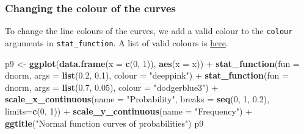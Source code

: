 \documentclass[]{article}
\newenvironment{Shaded}{\begin{snugshade}}{\end{snugshade}}
\newcommand{\KeywordTok}[1]{\textcolor[rgb]{0.13,0.29,0.53}{\textbf{{#1}}}}
\newcommand{\DataTypeTok}[1]{\textcolor[rgb]{0.13,0.29,0.53}{{#1}}}
\newcommand{\DecValTok}[1]{\textcolor[rgb]{0.00,0.00,0.81}{{#1}}}
\newcommand{\FloatTok}[1]{\textcolor[rgb]{0.00,0.00,0.81}{{#1}}}
\newcommand{\StringTok}[1]{\textcolor[rgb]{0.31,0.60,0.02}{{#1}}}
\newcommand{\NormalTok}[1]{{#1}}
\begin{document}
\subsubsection{Changing the colour of the
curves}\label{changing-the-colour-of-the-curves-1}

To change the line colours of the curves, we add a valid colour to the
\texttt{colour} arguments in \texttt{stat\_function}. A list of valid
colours is
\href{http://www.stat.columbia.edu/~tzheng/files/Rcolor.pdf}{here}.

\begin{Shaded}
\begin{Highlighting}[]
\NormalTok{p9 <-}\StringTok{ }\KeywordTok{ggplot}\NormalTok{(}\KeywordTok{data.frame}\NormalTok{(}\DataTypeTok{x =} \KeywordTok{c}\NormalTok{(}\DecValTok{0}\NormalTok{, }\DecValTok{1}\NormalTok{)), }\KeywordTok{aes}\NormalTok{(}\DataTypeTok{x =} \NormalTok{x)) +}
\StringTok{        }\KeywordTok{stat_function}\NormalTok{(}\DataTypeTok{fun =} \NormalTok{dnorm, }\DataTypeTok{args =} \KeywordTok{list}\NormalTok{(}\FloatTok{0.2}\NormalTok{, }\FloatTok{0.1}\NormalTok{),}
                      \DataTypeTok{colour =} \StringTok{"deeppink"}\NormalTok{) +}
\StringTok{        }\KeywordTok{stat_function}\NormalTok{(}\DataTypeTok{fun =} \NormalTok{dnorm, }\DataTypeTok{args =} \KeywordTok{list}\NormalTok{(}\FloatTok{0.7}\NormalTok{, }\FloatTok{0.05}\NormalTok{),}
                      \DataTypeTok{colour =} \StringTok{"dodgerblue3"}\NormalTok{) +}
\StringTok{        }\KeywordTok{scale_x_continuous}\NormalTok{(}\DataTypeTok{name =} \StringTok{"Probability"}\NormalTok{,}
                              \DataTypeTok{breaks =} \KeywordTok{seq}\NormalTok{(}\DecValTok{0}\NormalTok{, }\DecValTok{1}\NormalTok{, }\FloatTok{0.2}\NormalTok{),}
                              \DataTypeTok{limits=}\KeywordTok{c}\NormalTok{(}\DecValTok{0}\NormalTok{, }\DecValTok{1}\NormalTok{)) +}
\StringTok{        }\KeywordTok{scale_y_continuous}\NormalTok{(}\DataTypeTok{name =} \StringTok{"Frequency"}\NormalTok{) +}
\StringTok{        }\KeywordTok{ggtitle}\NormalTok{(}\StringTok{"Normal function curves of probabilities"}\NormalTok{)}
\NormalTok{p9}
\end{Highlighting}
\end{Shaded}
\end{document}
